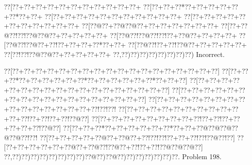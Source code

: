\documentclass[a5paper]{article}
\begin{document}
\begin{center}
{\goo
\0??[\0??+\0??+\0??+\0??+\0??+\0??+\0??+\0??+\0??+\0??+\0??+
\0??[\0??+\0??+\0??*\0??+\0??+\0??+\0??+\0??+\0??*\0??+\0??+
\0??[\0??+\0??+\0??+\0??+\0??+\0??+\0??+\0??+\0??+\0??+\0??+
\0??[\0??+\0??+\0??+\0??+\0??+\0??+\0??+\0??+\0??+\0??+\0??+
\0??[\0??@\0??+\0??@\0??@\0??+\0??+\0??+\0??+\0??+\0??+\0??+
\0??[\0??+\0??@\0??!\0??!\0??@\0??@\0??+\0??+\0??+\0??+\0??+
\0??[\0??@\0??!\0??@\0??!\0??!\0??+\0??@\0??+\0??+\0??+\0??+
\0??[\0??@\0??!\0??@\0??+\0??!\0??+\0??+\0??+\0??*\0??+\0??+
\0??[\0??@\0??!\0??+\0??!\0??@\0??+\0??+\0??+\0??+\0??+
\0??[\0??!\0??!\0??@\0??@\0??+\0??+\0??+\0??+\0??+
\0??,\0??)\0??)\0??)\0??)\0??)\0??)\0??)\0??)
}
Incorrect. 

\end{center}
\newpage
\begin{center}
{\goo
\0??[\0??+\0??+\0??+\0??+\0??+\0??+\0??+\0??+\0??+\0??+\0??+\0??+\0??+\0??+\0??+\0??+\0??+\0??]
\0??[\0??+\0??+\0??*\0??+\0??+\0??+\0??+\0??+\0??*\0??+\0??+\0??+\0??+\0??+\0??*\0??+\0??+\0??]
\0??[\0??+\0??+\0??+\0??+\0??+\0??+\0??+\0??+\0??+\0??+\0??+\0??+\0??+\0??+\0??+\0??+\0??+\0??]
\0??[\0??+\0??+\0??+\0??+\0??+\0??+\0??+\0??+\0??+\0??+\0??+\0??+\0??+\0??+\0??+\0??+\0??+\0??]
\0??[\0??+\0??+\0??+\0??+\0??+\0??+\0??+\0??+\0??+\0??+\0??+\0??+\0??+\0??+\0??+\0??!\0??!\0??!
\0??[\0??+\0??+\0??+\0??+\0??+\0??+\0??+\0??+\0??+\0??+\0??+\0??!\0??+\0??!\0??+\0??!\0??@\0??]
\0??[\0??+\0??+\0??+\0??+\0??+\0??+\0??+\0??+\0??!\0??+\0??!\0??+\0??+\0??+\0??+\0??!\0??@\0??]
\0??[\0??+\0??+\0??*\0??+\0??+\0??+\0??+\0??+\0??*\0??+\0??+\0??@\0??@\0??@\0??@\0??@\0??!\0??!
\0??[\0??+\0??+\0??+\0??+\0??@\0??+\0??@\0??+\0??!\0??!\0??!\0??+\0??+\0??!\0??!\0??@\0??!\0??]
\0??[\0??+\0??+\0??+\0??+\0??+\0??@\0??+\0??@\0??!\0??@\0??+\0??!\0??+\0??!\0??@\0??@\0??@\0??]
\0??,\0??)\0??)\0??)\0??)\0??)\0??)\0??)\0??)\0??@\0??)\0??@\0??)\0??)\0??)\0??)\0??)\0??)\0??.
}
Problem 198.

\end{center}
\end{document}
